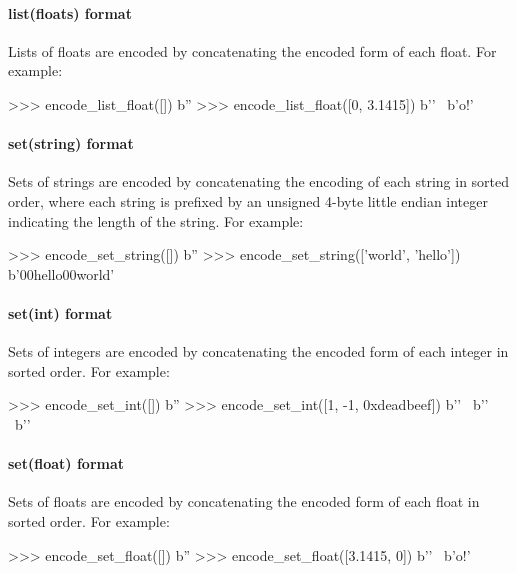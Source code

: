 \paragraph{list(floats) format}

Lists of floats are encoded by concatenating the encoded form of each float.
For example:

\begin{pythoncode}
>>> encode_list_float([])
b''
>>> encode_list_float([0, 3.1415])
b'' \
b'o\xca!\t@'
\end{pythoncode}

\paragraph{set(string) format}

Sets of strings are encoded by concatenating the encoding of each string in
sorted order, where each string is prefixed by an unsigned 4-byte little endian
integer indicating the length of the string.  For example:

\begin{pythoncode}
>>> encode_set_string([])
b''
>>> encode_set_string(['world', 'hello'])
b'\x00\x00hello\x05\x00\x00\x00world'
\end{pythoncode}

\paragraph{set(int) format}

Sets of integers are encoded by concatenating the encoded form of each integer
in sorted order.  For example:

\begin{pythoncode}
>>> encode_set_int([])
b''
>>> encode_set_int([1, -1, 0xdeadbeef])
b'\xff\xff\xff\xff\xff\xff\xff\xff' \
b'' \
b'\xef\xbe\xad\xde{}'
\end{pythoncode}

\paragraph{set(float) format}

Sets of floats are encoded by concatenating the encoded form of each float in
sorted order.  For example:

\begin{pythoncode}
>>> encode_set_float([])
b''
>>> encode_set_float([3.1415, 0])
b'\x00\x00\x00\x00' \
b'o\xca!\t@'
\end{pythoncode}

